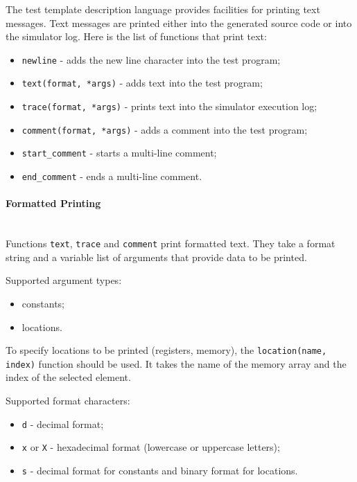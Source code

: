 \documentclass[oneside,final,12pt]{extreport}
\begin{document}
The test template description language provides facilities for printing text messages.
Text messages are printed either into the generated source code or into the simulator log.
Here is the list of functions that print text:

\begin{itemize}
\item \texttt{newline} - adds the new line character into the test program;
\item \texttt{text(format, *args)} - adds text into the test program;
\item \texttt{trace(format, *args)} - prints text into the simulator execution log;
\item \texttt{comment(format, *args)} - adds a comment into the test program;
\item \texttt{start{\_}comment} - starts a multi-line comment;
\item \texttt{end{\_}comment} - ends a multi-line comment.
\end{itemize}

\paragraph{Formatted Printing} ~\\

Functions \texttt{text}, \texttt{trace} and \texttt{comment} print formatted text.
They take a format string and a variable list of arguments that provide data to be
printed.

Supported argument types:
\begin{itemize}
\item constants;
\item locations.
\end{itemize}

To specify locations to be printed (registers, memory), the \texttt{location(name, index)}
function should be used. It takes the name of the memory array and the index of the selected
element.

Supported format characters:
\begin{itemize}
\item \texttt{d} - decimal format;
\item \texttt{x} or \texttt{X} - hexadecimal format (lowercase or uppercase letters);
\item \texttt{s} - decimal format for constants and binary format for locations.
\end{itemize}
\end{document}
